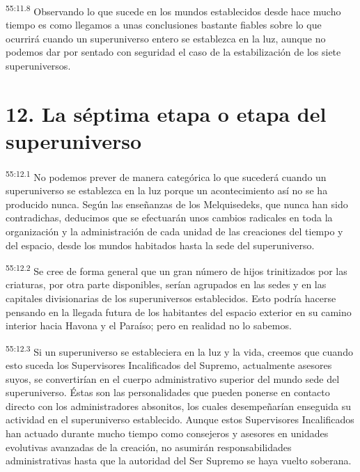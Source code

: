 \par
\textsuperscript{55:11.8} Observando lo que sucede en los mundos establecidos desde hace mucho tiempo es como llegamos a unas conclusiones bastante fiables sobre lo que ocurrirá cuando un superuniverso entero se establezca en la luz, aunque no podemos dar por sentado con seguridad el caso de la estabilización de los siete superuniversos.

\section*{12. La séptima etapa o etapa del superuniverso}
\par
\textsuperscript{55:12.1} No podemos prever de manera categórica lo que sucederá cuando un superuniverso se establezca en la luz porque un acontecimiento así no se ha producido nunca. Según las enseñanzas de los Melquisedeks, que nunca han sido contradichas, deducimos que se efectuarán unos cambios radicales en toda la organización y la administración de cada unidad de las creaciones del tiempo y del espacio, desde los mundos habitados hasta la sede del superuniverso.

\par
\textsuperscript{55:12.2} Se cree de forma general que un gran número de hijos trinitizados por las criaturas, por otra parte disponibles, serían agrupados en las sedes y en las capitales divisionarias de los superuniversos establecidos. Esto podría hacerse pensando en la llegada futura de los habitantes del espacio exterior en su camino interior hacia Havona y el Paraíso; pero en realidad no lo sabemos.

\par
\textsuperscript{55:12.3} Si un superuniverso se estableciera en la luz y la vida, creemos que cuando esto suceda los Supervisores Incalificados del Supremo, actualmente asesores suyos, se convertirían en el cuerpo administrativo superior del mundo sede del superuniverso. Éstas son las personalidades que pueden ponerse en contacto directo con los administradores absonitos, los cuales desempeñarían enseguida su actividad en el superuniverso establecido. Aunque estos Supervisores Incalificados han actuado durante mucho tiempo como consejeros y asesores en unidades evolutivas avanzadas de la creación, no asumirán responsabilidades administrativas hasta que la autoridad del Ser Supremo se haya vuelto soberana.

